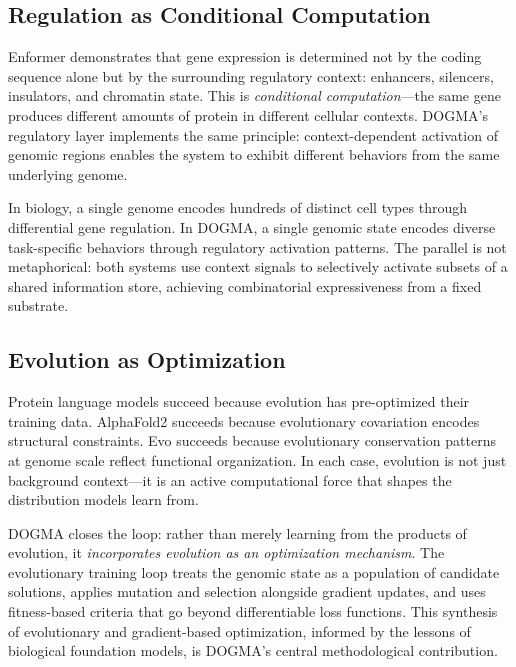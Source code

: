 \subsection{Regulation as Conditional Computation}

Enformer demonstrates that gene expression is determined not by the coding sequence alone but by the surrounding regulatory context: enhancers, silencers, insulators, and chromatin state. This is \emph{conditional computation}---the same gene produces different amounts of protein in different cellular contexts. DOGMA's regulatory layer implements the same principle: context-dependent activation of genomic regions enables the system to exhibit different behaviors from the same underlying genome.

\begin{keyinsight}
In biology, a single genome encodes hundreds of distinct cell types through differential gene regulation. In DOGMA, a single genomic state encodes diverse task-specific behaviors through regulatory activation patterns. The parallel is not metaphorical: both systems use context signals to selectively activate subsets of a shared information store, achieving combinatorial expressiveness from a fixed substrate.
\end{keyinsight}

\subsection{Evolution as Optimization}

Protein language models succeed because evolution has pre-optimized their training data. AlphaFold2 succeeds because evolutionary covariation encodes structural constraints. Evo succeeds because evolutionary conservation patterns at genome scale reflect functional organization. In each case, evolution is not just background context---it is an active computational force that shapes the distribution models learn from.

DOGMA closes the loop: rather than merely learning from the products of evolution, it \emph{incorporates evolution as an optimization mechanism}. The evolutionary training loop treats the genomic state as a population of candidate solutions, applies mutation and selection alongside gradient updates, and uses fitness-based criteria that go beyond differentiable loss functions. This synthesis of evolutionary and gradient-based optimization, informed by the lessons of biological foundation models, is DOGMA's central methodological contribution.

